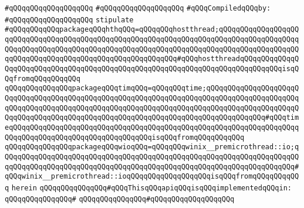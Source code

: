 \verb|#qQQqqQQqqQQqqQQqqQQq|\newline
\verb|#qQQqqQQqqQQqqQQqqQQq|\newline
\newline
\verb|#qQQqCompiledqQQqby:|\newline
\verb|#qQQqqQQqqQQqqQQqqQQq|\newline
\newline
\verb|stipulate|\newline
\verb|#qQQqqQQqqQQqpackageqQQqhthqQQq=qQQqqQQqhostthread;qQQqqQQqqQQqqQQqqQQqqQQqqQQqqQQqqQQqqQQqqQQqqQQqqQQqqQQqqQQqqQQqqQQqqQQqqQQqqQQqqQQqqQQqqQQqqQQqqQQqqQQqqQQqqQQqqQQqqQQqqQQqqQQqqQQqqQQqqQQqqQQqqQQqqQQqqQQqqQQqqQQqqQQqqQQqqQQqqQQqqQQqqQQqqQQqqQQqqQQq#qQQqhostthreadqQQqqQQqqQQqqQQqqQQqqQQqqQQqqQQqqQQqqQQqqQQqqQQqqQQqqQQqqQQqqQQqqQQqqQQqqQQqqQQqisqQQqfromqQQqqQQqqQQq|\newline
\verb|qQQqqQQqqQQqqQQqpackageqQQqtimqQQq=qQQqqQQqtime;qQQqqQQqqQQqqQQqqQQqqQQqqQQqqQQqqQQqqQQqqQQqqQQqqQQqqQQqqQQqqQQqqQQqqQQqqQQqqQQqqQQqqQQqqQQqqQQqqQQqqQQqqQQqqQQqqQQqqQQqqQQqqQQqqQQqqQQqqQQqqQQqqQQqqQQqqQQqqQQqqQQqqQQqqQQqqQQqqQQqqQQqqQQqqQQqqQQqqQQqqQQqqQQqqQQqqQQqqQQqqQQq#qQQqtimeqQQqqQQqqQQqqQQqqQQqqQQqqQQqqQQqqQQqqQQqqQQqqQQqqQQqqQQqqQQqqQQqqQQqqQQqqQQqqQQqqQQqqQQqqQQqqQQqqQQqqQQqisqQQqfromqQQqqQQqqQQq|\newline
\verb|qQQqqQQqqQQqqQQqpackageqQQqwioqQQq=qQQqqQQqwinix__premicrothread::io;qQQqqQQqqQQqqQQqqQQqqQQqqQQqqQQqqQQqqQQqqQQqqQQqqQQqqQQqqQQqqQQqqQQqqQQqqQQqqQQqqQQqqQQqqQQqqQQqqQQqqQQqqQQqqQQqqQQqqQQqqQQqqQQqqQQqqQQqqQQq#qQQqwinix__premicrothread::ioqQQqqQQqqQQqqQQqqQQqisqQQqfromqQQqqQQqqQQq|\newline
\verb|herein|\newline
\newline
\verb|qQQqqQQqqQQqqQQq#qQQqThisqQQqapiqQQqisqQQqimplementedqQQqin:|\newline
\verb|qQQqqQQqqQQqqQQq#|\newline
\verb|qQQqqQQqqQQqqQQq#qQQqqQQqqQQqqQQqqQQq|\newline

